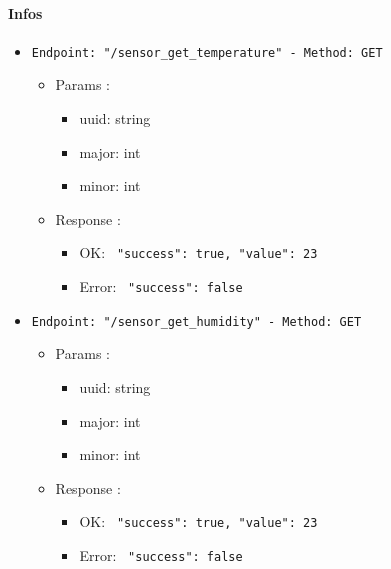 \paragraph{Infos}

\begin{itemize}
  \item \texttt{Endpoint: "/sensor_get_temperature" -  Method: GET}
  \begin{itemize} 
    \item Params :
    \begin{itemize}
      \item uuid: string
      \item major: int
      \item minor: int
    \end{itemize}

    \item Response : 
    \begin{itemize}
      \item OK: \texttt{{ "success": true, "value": 23 }}
      \item Error: \texttt{{ "success": false }}
    \end{itemize}
  \end{itemize}
\end{itemize}

\begin{itemize}
  \item \texttt{Endpoint: "/sensor_get_humidity" -  Method: GET}
  \begin{itemize} 
    \item Params :
    \begin{itemize}
      \item uuid: string
      \item major: int
      \item minor: int
    \end{itemize}

    \item Response : 
    \begin{itemize}
      \item OK: \texttt{{ "success": true, "value": 23 }}
      \item Error: \texttt{{ "success": false }}
    \end{itemize}
  \end{itemize}
\end{itemize}

